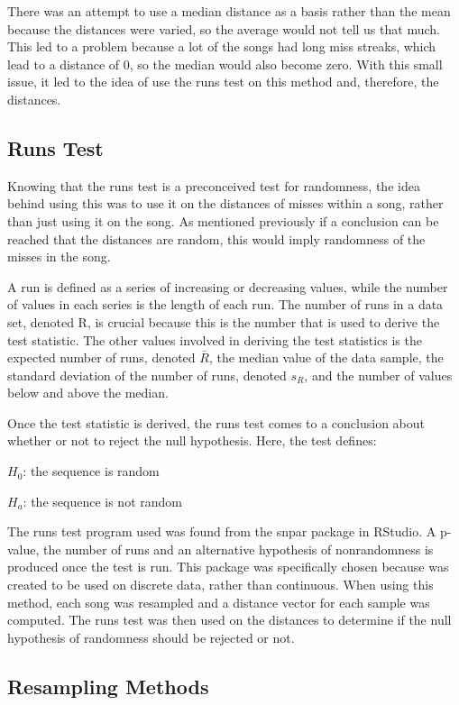 \documentclass[12pt, letterpaper]{article}
\begin{document}
There was an attempt to use a median distance as a basis rather than the mean because the distances were varied, so the average would not tell us that much.  This led to a problem because a lot of the songs had long miss streaks, which lead to a distance of 0, so the median would also become zero.  With this small issue, it led to the idea of use the runs test on this method and, therefore, the distances.  

\subsection{Runs Test}
Knowing that the runs test is a preconceived test for randomness, the idea behind using this was to use it on the distances of misses within a song, rather than just using it on the song. As mentioned previously if a conclusion can be reached that the distances are random, this would imply randomness of the misses in the song. 

A run is defined as a series of increasing or decreasing values, while the number of values in each series is the length of each run. The number of runs in a data set, denoted R, is crucial because this is the number that is used to derive the test statistic. The other values involved in deriving the test statistics is the expected number of runs, denoted $\bar{R}$, the median value of the data sample, the standard deviation of the number of runs, denoted $s_{R}$, and the number of values below and above the median. 

Once the test statistic is derived, the runs test comes to a conclusion about whether or not to reject the null hypothesis. Here, the test defines: 

$H_{0}$: the sequence is random

$H_{a}$: the sequence is not random

The runs test program used was found from the snpar package in RStudio. A p-value, the number of runs and an alternative hypothesis of nonrandomness is produced once the test is run. This package was specifically chosen because was created to be used on discrete data, rather than continuous. When using this method, each song was resampled and a distance vector for each sample was computed. The runs test was then used on the distances to determine if the null hypothesis of randomness should be rejected or not. 

\subsection{Resampling Methods}
\end{document}
